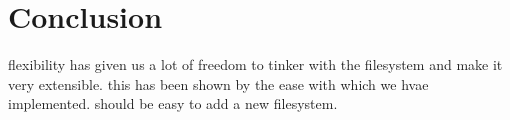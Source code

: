 \section{Conclusion}
\label{sec:conclusion}

flexibility has given us a lot of freedom to tinker with the
filesystem and make it very extensible. this has been shown by the
ease with which we hvae implemented. should be easy to add a new
filesystem.
